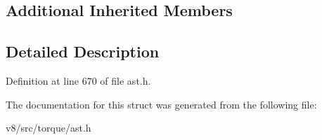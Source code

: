 \subsection*{Additional Inherited Members}


\subsection{Detailed Description}


Definition at line 670 of file ast.\+h.



The documentation for this struct was generated from the following file\+:\begin{DoxyCompactItemize}
\item 
v8/src/torque/ast.\+h\end{DoxyCompactItemize}

